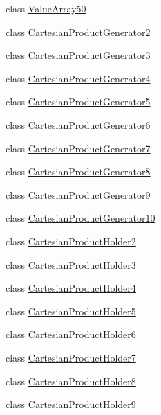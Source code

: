 \begin{DoxyCompactItemize}
\item 
class \hyperlink{classtesting_1_1internal_1_1ValueArray50}{Value\-Array50}
\item 
class \hyperlink{classtesting_1_1internal_1_1CartesianProductGenerator2}{Cartesian\-Product\-Generator2}
\item 
class \hyperlink{classtesting_1_1internal_1_1CartesianProductGenerator3}{Cartesian\-Product\-Generator3}
\item 
class \hyperlink{classtesting_1_1internal_1_1CartesianProductGenerator4}{Cartesian\-Product\-Generator4}
\item 
class \hyperlink{classtesting_1_1internal_1_1CartesianProductGenerator5}{Cartesian\-Product\-Generator5}
\item 
class \hyperlink{classtesting_1_1internal_1_1CartesianProductGenerator6}{Cartesian\-Product\-Generator6}
\item 
class \hyperlink{classtesting_1_1internal_1_1CartesianProductGenerator7}{Cartesian\-Product\-Generator7}
\item 
class \hyperlink{classtesting_1_1internal_1_1CartesianProductGenerator8}{Cartesian\-Product\-Generator8}
\item 
class \hyperlink{classtesting_1_1internal_1_1CartesianProductGenerator9}{Cartesian\-Product\-Generator9}
\item 
class \hyperlink{classtesting_1_1internal_1_1CartesianProductGenerator10}{Cartesian\-Product\-Generator10}
\item 
class \hyperlink{classtesting_1_1internal_1_1CartesianProductHolder2}{Cartesian\-Product\-Holder2}
\item 
class \hyperlink{classtesting_1_1internal_1_1CartesianProductHolder3}{Cartesian\-Product\-Holder3}
\item 
class \hyperlink{classtesting_1_1internal_1_1CartesianProductHolder4}{Cartesian\-Product\-Holder4}
\item 
class \hyperlink{classtesting_1_1internal_1_1CartesianProductHolder5}{Cartesian\-Product\-Holder5}
\item 
class \hyperlink{classtesting_1_1internal_1_1CartesianProductHolder6}{Cartesian\-Product\-Holder6}
\item 
class \hyperlink{classtesting_1_1internal_1_1CartesianProductHolder7}{Cartesian\-Product\-Holder7}
\item 
class \hyperlink{classtesting_1_1internal_1_1CartesianProductHolder8}{Cartesian\-Product\-Holder8}
\item 
class \hyperlink{classtesting_1_1internal_1_1CartesianProductHolder9}{Cartesian\-Product\-Holder9}

\end{DoxyCompactItemize}

